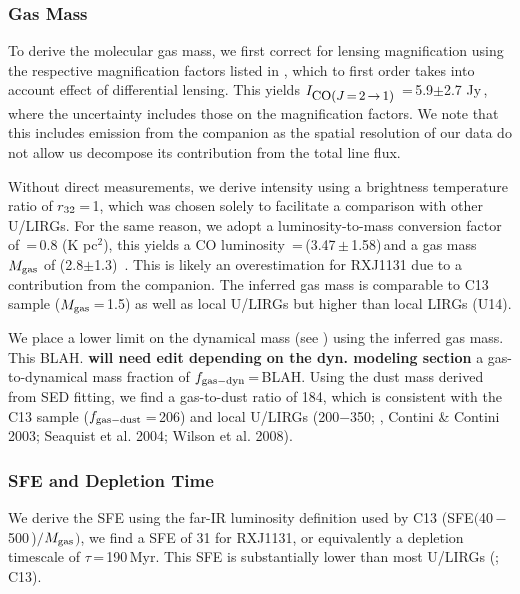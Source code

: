 \documentclass[]{emulateapj}
\begin{document}
\subsubsection{Gas Mass}
To derive the molecular gas mass, we first correct for lensing magnification
using the respective magnification factors listed in , which to
first order takes into account effect of differential lensing. This yields
$I_{\small \mbox{CO($J$\,=\,2\,$\rightarrow$\,1) }}$\,=\,5.9$\pm$2.7 Jy\,\kms,
where the uncertainty includes those on
the magnification factors.
We note that this includes emission from the companion
as the spatial resolution of our data do not allow us decompose its
contribution from the total line flux.

Without direct  measurements,
we derive  intensity
using a brightness temperature ratio of $r_{\rm 32}$\,=\,1, which was chosen
solely to facilitate a comparison with other U/LIRGs.
For the same reason, we
adopt a luminosity-to-mass conversion factor of
\alphaco\,=\,0.8 (K \kms pc$^2$)\pmOne, this yields a
CO luminosity \Lp\,=\,(3.47\,$\pm$\,1.58)\,\LpU and a gas mass
$M_{\rm gas}$ of (2.8$\pm$1.3)\, \Msun. This is likely
an overestimation for RXJ1131 due to a contribution from the companion.
The inferred gas mass is comparable to
C13 sample ($M_{\rm gas}$\,=\,1.5\Msun) as well as
local U/LIRGs \citep{Solomon97a, Sanders96a} but higher than
local LIRGs (U14).

We place a lower limit on the dynamical mass (see ) using
the inferred gas mass. This BLAH.
 {\bf will need edit depending on the dyn. modeling section}
a gas-to-dynamical mass fraction of $f_{\rm gas-dyn}$\,=\,BLAH.
Using the dust mass derived from SED fitting,
we find a gas-to-dust ratio of 184, which is consistent with
the C13 sample ($f_{\rm gas-dust}$\,=\,206) and local U/LIRGs
(200$-$350; \citealt{Sanders91a}, Contini \& Contini 2003; Seaquist et al. 2004; Wilson et al. 2008).

\subsubsection{SFE and Depletion Time}
We derive the SFE using the far-IR luminosity definition used by
C13 (\ie SFE\pmm\LFIR$($40\,$-$\,500\,\micron)$/$$M_{\rm gas}$$)$,
we find a SFE of 31 for RXJ1131, or equivalently a depletion
timescale of $\tau$\,=\,190\,Myr. %
This SFE is substantially lower than most U/LIRGs
(\citealt{Solomon97a,Combes11a}; C13). %
\end{document}
